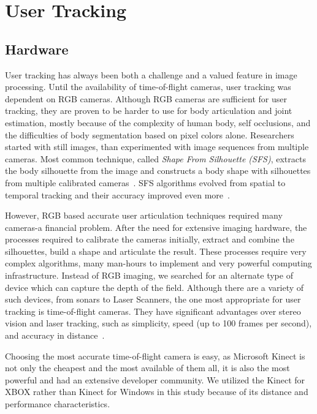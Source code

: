 \chapter{User Tracking}
\label{appendix_user_tracking}

\section{Hardware}

User tracking has always been both a challenge and a valued feature in image processing. Until the availability of time-of-flight cameras, user tracking was dependent on RGB cameras. Although RGB cameras are sufficient for user tracking, they are proven to be harder to use for body articulation and joint estimation, mostly because of the complexity of human body, self occlusions, and the difficulties of body segmentation based on pixel colors alone. Researchers started with still images, than experimented with image sequences from multiple cameras. Most common technique, called {\em Shape From Silhouette (SFS)}, extracts the body silhouette from the image and constructs a body shape with silhouettes from multiple calibrated cameras~\cite{Cheung2005}. SFS algorithms evolved from spatial to temporal tracking and their accuracy improved even more~\cite{Cheung2005}. 

However, RGB based accurate user articulation techniques required many cameras-a financial problem. After the need for extensive imaging hardware, the processes required to calibrate the cameras initially, extract and combine the silhouettes, build a shape and articulate the result. These processes require very complex algorithms, many man-hours to implement and very powerful computing infrastructure. Instead of RGB imaging, we searched for an alternate type of device which can capture the depth of the field. Although there are a variety of such devices, from sonars to Laser Scanners, the one most appropriate for user tracking is time-of-flight cameras. They have significant advantages over stereo vision and laser tracking, such as simplicity, speed (up to 100 frames per second), and accuracy in distance~\cite{Kourosh2012}.

Choosing the most accurate time-of-flight camera is easy, as Microsoft Kinect is not only the cheapest and the most available of them all, it is also the most powerful and had an extensive developer community. We utilized the Kinect for XBOX rather than Kinect for Windows in this study because of its distance and performance characteristics.


